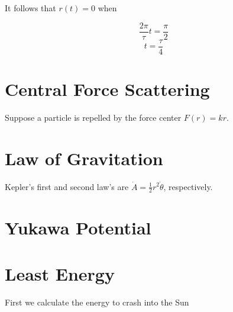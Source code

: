 It follows that $r(t) = 0$ when

$$
\frac{2\pi}{\tau}t = \frac{\pi}{2}
$$
$$
t = \frac{\tau}{4}
$$
\section{Central Force Scattering}
Suppose a particle is repelled by the force center $F(r) = kr$.
\section{Law of Gravitation}
Kepler's first and second law's are $\dot{A} = \frac{1}{2}r^2\dot{\theta}$, respectively.

\section{Yukawa Potential}

\section{Least Energy}
First we calculate the energy to crash into the Sun